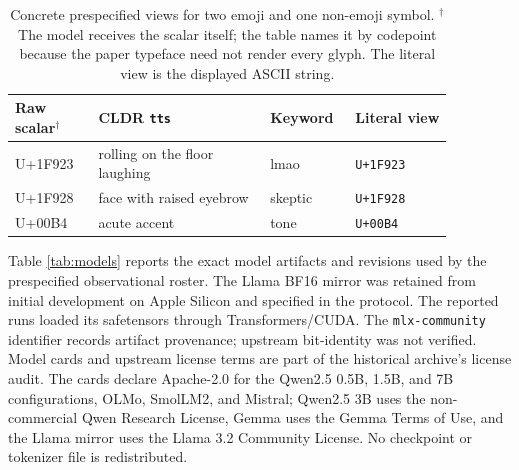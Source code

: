\documentclass{article}
\begin{document}
\begin{table}[H]
\centering
\scriptsize
\setlength{\tabcolsep}{2.5pt}
\begin{tabular}{p{0.17\linewidth}p{0.35\linewidth}p{0.15\linewidth}p{0.20\linewidth}}
\toprule
Raw scalar$^\dagger$ & CLDR \texttt{tts} & Keyword & Literal view \\
\midrule
U+1F923 & rolling on the floor laughing & lmao & \texttt{U+1F923} \\
U+1F928 & face with raised eyebrow & skeptic & \texttt{U+1F928} \\
U+00B4  & acute accent & tone & \texttt{U+00B4} \\
\bottomrule
\end{tabular}
\caption{Concrete prespecified views for two emoji and one non-emoji symbol.
$^\dagger$The model receives the scalar itself; the table names it by codepoint
because the paper typeface need not render every glyph. The literal view is
the displayed ASCII string.}
\label{tab:examples}
\end{table}

Table \ref{tab:models} reports the exact model artifacts and revisions used by
the prespecified observational roster. The Llama BF16 mirror was retained
from initial development on Apple Silicon and specified in the protocol.
The reported runs loaded its safetensors through Transformers/CUDA.
The \texttt{mlx-community} identifier records artifact provenance; upstream
bit-identity was not verified. Model cards
and upstream license terms are part of the historical archive's license audit.
The cards declare Apache-2.0 for the Qwen2.5 0.5B, 1.5B, and 7B configurations, OLMo,
SmolLM2, and Mistral; Qwen2.5 3B uses the non-commercial Qwen Research
License, Gemma uses the Gemma Terms of Use, and the Llama mirror uses the
Llama 3.2 Community License. No checkpoint or tokenizer file is redistributed.
\end{document}
